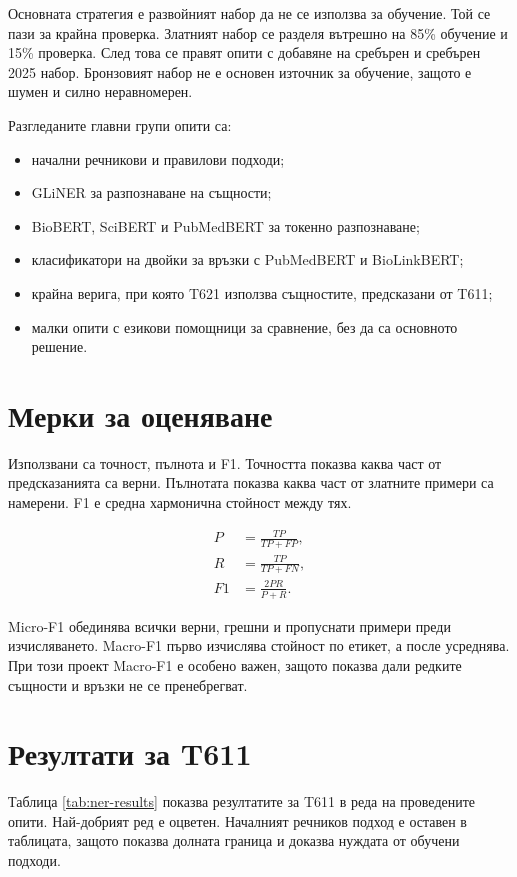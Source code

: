 \documentclass[12pt,a4paper]{article}
\begin{document}
Основната стратегия е развойният набор да не се използва за обучение. Той се пази за крайна проверка. Златният набор се разделя вътрешно на 85\% обучение и 15\% проверка. След това се правят опити с добавяне на сребърен и сребърен 2025 набор. Бронзовият набор не е основен източник за обучение, защото е шумен и силно неравномерен.

Разгледаните главни групи опити са:

\begin{itemize}
\item начални речникови и правилови подходи;
\item GLiNER за разпознаване на същности;
\item BioBERT, SciBERT и PubMedBERT за токенно разпознаване;
\item класификатори на двойки за връзки с PubMedBERT и BioLinkBERT;
\item крайна верига, при която T621 използва същностите, предсказани от T611;
\item малки опити с езикови помощници за сравнение, без да са основното решение.
\end{itemize}

\section{Мерки за оценяване}

Използвани са точност, пълнота и F1. Точността показва каква част от предсказанията са верни. Пълнотата показва каква част от златните примери са намерени. F1 е средна хармонична стойност между тях.

\begin{align*}
P &= \frac{TP}{TP + FP}, \\
R &= \frac{TP}{TP + FN}, \\
F1 &= \frac{2PR}{P + R}.
\end{align*}

Micro-F1 обединява всички верни, грешни и пропуснати примери преди изчисляването. Macro-F1 първо изчислява стойност по етикет, а после усреднява. При този проект Macro-F1 е особено важен, защото показва дали редките същности и връзки не се пренебрегват.

\section{Резултати за T611}

Таблица \ref{tab:ner-results} показва резултатите за T611 в реда на проведените опити. Най-добрият ред е оцветен. Началният речников подход е оставен в таблицата, защото показва долната граница и доказва нуждата от обучени подходи.
\end{document}
